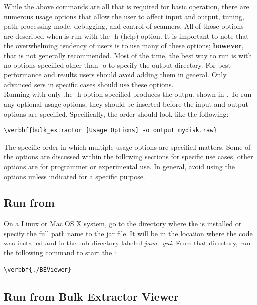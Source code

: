 \documentclass[11pt]{article} %
\begin{document}
While the above commands are all that is required for basic operation, there are numerous usage options that allow the user to affect input and output, tuning, path processing mode, debugging, and control of scanners. All of those options are described when \bulk is run with the -h (help) option. It is important to note that the overwhelming tendency of users is to use many of these options; \textbf{however}, that is not generally recommended. Most of the time, the best way to run \bulk is with no options specified other than -o to specify the output directory. For best performance and results users should avoid adding them in general. Only advanced sers in specific cases should use these options.\\

Running \bulk with only the -h option specified produces the output shown in \textbf{}.  To run any optional usage options, they should be inserted before the input and output options are specified. Specifically, the order should look like the following:

\begin{Verbatim}[commandchars=\\\{\}]
\verbbf{bulk_extractor [Usage Options] -o output mydisk.raw}
\end{Verbatim}

The specific order in which multiple usage options are specified matters. Some of the options are discussed within the following sections for specific use cases, other options are for programmer or experimental use. In general, avoid using the options unless indicated for a specific purpose.\\

\subsection{Run \bulk from \viewer}
\label{RunningViewer}

On a Linux or Mac OS X system, go to the directory where the \viewer is installed or specify the full path name to the jar file. It will be in the location where the \bulk code was installed and in the sub-directory labeled \textit{java\_gui}. From that directory, run the following command to start the \viewer:
\begin{Verbatim}[commandchars=\\\{\}]
\verbbf{./BEViewer}
\end{Verbatim}

\subsection {Run \bulk from Bulk Extractor Viewer}
\end{document}
